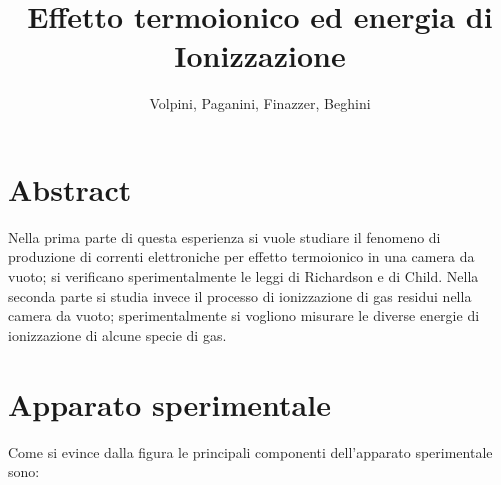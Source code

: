 \documentclass[11pt,a4paper]{article}
\author{Volpini, Paganini, Finazzer, Beghini}
\title{Effetto termoionico ed energia di Ionizzazione }
\begin{document}
\maketitle 
\section{Abstract}
Nella prima parte di questa esperienza si vuole studiare il fenomeno di produzione di correnti elettroniche per effetto termoionico in una camera da vuoto; si verificano sperimentalmente le leggi di Richardson e di Child. Nella seconda parte si studia invece il processo di ionizzazione di gas residui nella camera da vuoto; sperimentalmente si vogliono misurare le diverse energie di ionizzazione di alcune specie di gas.  
\section{Apparato sperimentale}

Come si evince dalla figura le principali componenti dell'apparato sperimentale sono:
\end{document}
